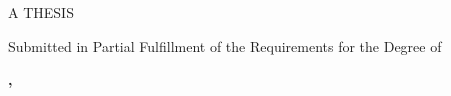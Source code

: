 \begin{titlepage}
{\begin{minipage}[c][\dimexpr\textheight-2\fboxrule\relax][c]{\dimexpr\textwidth-2\fboxrule\relax}
      \vspace{1.2cm}

      {\large A THESIS\par}
      \vspace{0.2cm}
      {\small Submitted in Partial Fulfillment of the Requirements for the Degree of\par}
      \vspace{0.1cm}
      {\large\bfseries \degreeaward \par}

      \vfill

      {\large\textbf{\submissionplace, \submissionyear}\par}
      \vspace{0.3cm}
      {\small\textcopyright\ \submissionyear\ \thesisauthor\par}
      \vspace{0.6cm}
    \end{minipage}%
  }
\end{titlepage}
